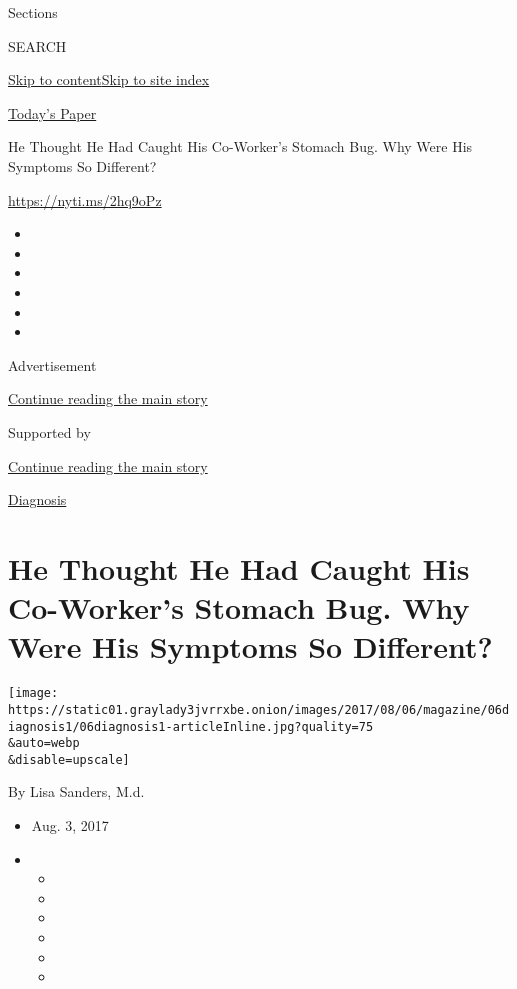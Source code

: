 Sections

SEARCH

\protect\hyperlink{site-content}{Skip to
content}\protect\hyperlink{site-index}{Skip to site index}

\href{https://myaccount.nytimes3xbfgragh.onion/auth/login?response_type=cookie\&client_id=vi}{}

\href{https://www.nytimes3xbfgragh.onion/section/todayspaper}{Today's
Paper}

He Thought He Had Caught His Co-Worker's Stomach Bug. Why Were His
Symptoms So Different?

\url{https://nyti.ms/2hq9oPz}

\begin{itemize}
\item
\item
\item
\item
\item
\item
\end{itemize}

Advertisement

\protect\hyperlink{after-top}{Continue reading the main story}

Supported by

\protect\hyperlink{after-sponsor}{Continue reading the main story}

\href{/column/diagnosis}{Diagnosis}

\hypertarget{he-thought-he-had-caught-his-co-workers-stomach-bug-why-were-his-symptoms-so-different}{%
\section{He Thought He Had Caught His Co-Worker's Stomach Bug. Why Were
His Symptoms So
Different?}\label{he-thought-he-had-caught-his-co-workers-stomach-bug-why-were-his-symptoms-so-different}}

\texttt{[image: https://static01.graylady3jvrrxbe.onion/images/2017/08/06/magazine/06diagnosis1/06diagnosis1-articleInline.jpg?quality=75\\\&auto=webp\\\&disable=upscale]}

By Lisa Sanders, M.d.

\begin{itemize}
\item
  Aug. 3, 2017
\item
  \begin{itemize}
  \item
  \item
  \item
  \item
  \item
  \item
  \end{itemize}
\end{itemize}

